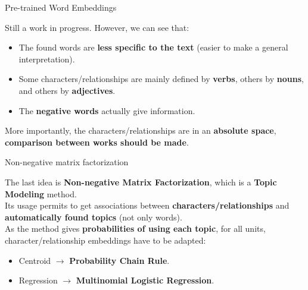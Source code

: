 \documentclass[10pt]{beamer}
\newcommand{\imp}[1]{\textbf{\color{cyan}#1}}
\begin{document}
	
	\begin{frame}{Pre-trained Word Embeddings}
		
		Still a work in progress. However, we can see that:
		\begin{itemize}
			\item The found words are \imp{less specific to the text} (easier to make a general interpretation).
			\item Some characters/relationships are mainly defined by \imp{verbs}, others by \imp{nouns}, and others by \imp{adjectives}.
			\item The \imp{negative words} actually give information.
		\end{itemize}
		More importantly, the characters/relationships are in an \imp{absolute space}, \imp{comparison between works should be made}.
		
	\end{frame}
	
	
	\begin{frame}{Non-negative matrix factorization}
		
		The last idea is \imp{Non-negative Matrix Factorization}, which is a \imp{Topic Modeling} method. \\
		\vspace{0.3cm}
		Its usage permits to get associations between \imp{characters/relationships} and \imp{automatically found topics} (not only words).\\
		\vspace{0.3cm}
		As the method gives \imp{probabilities of using each topic}, for all units, character/relationship embeddings have to be adapted:
		\begin{itemize}
			\item Centroid $\rightarrow$ \imp{Probability Chain Rule}.
			\item Regression $\rightarrow$ \imp{Multinomial Logistic Regression}. 
		\end{itemize} 
	\end{frame}
	
	
\end{document}
